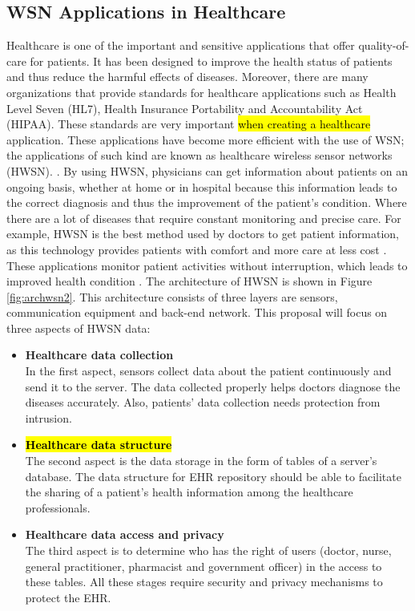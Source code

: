 \documentclass[a4paper,11pt]{article}
\DeclareRobustCommand{\hlyellow}[1]{{\sethlcolor{white}\hl{#1}}}
\begin{document}
\subsection{WSN Applications in Healthcare}
Healthcare is one of the important and sensitive applications that offer quality-of-care for patients. It has been designed to improve the health status of patients and thus reduce the harmful effects of diseases. Moreover, there are many organizations that provide standards for healthcare applications such as Health Level Seven (HL7), Health Insurance Portability and Accountability Act (HIPAA). These standards are very important \hlyellow{when creating a healthcare} application. These applications have become more efficient with the use of WSN; the applications of such kind are known as healthcare wireless sensor networks (HWSN).  \cite{pr1}. By using HWSN, physicians can get information about patients on an ongoing basis, whether at home or in hospital because this information leads to the correct diagnosis and thus the improvement of the patient's condition. Where there are a lot of diseases that require constant monitoring and precise care. For example, HWSN is the best method used by doctors to get patient information, as this technology provides patients with comfort and more care at less cost \cite{pr1}. These applications monitor patient activities without interruption, which leads to improved health condition \cite{pr11}. The architecture of HWSN is shown in Figure \ref{fig:archwsn2}. This architecture consists of three layers are sensors, communication equipment and back-end network. This proposal will focus on three aspects of HWSN data:
\begin{itemize}
\item \textbf{Healthcare data collection}\\
In the first aspect, sensors collect data about the patient continuously and send it to the server. The data collected properly helps doctors diagnose the diseases accurately. Also, patients' data collection needs protection from intrusion.

\item \textbf{\hlyellow{Healthcare data structure}}\\
The second aspect is the data storage in the form of tables of a server's database. The data structure for EHR repository should be able to facilitate the sharing of a patient's health information among the healthcare professionals. 

\item \textbf{Healthcare data access and privacy}\\
The third aspect is to determine who has the right of users (doctor, nurse, general practitioner, pharmacist and government officer) in the access to these tables. All these stages require security and privacy mechanisms to protect the EHR.
\end{itemize}
\end{document}
